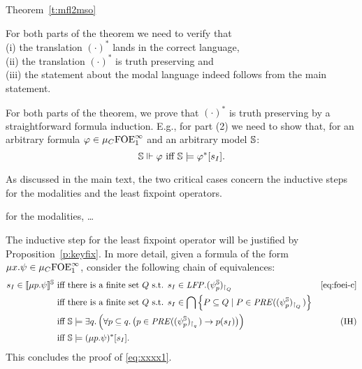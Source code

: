 \begin{proofof}{Theorem~\ref{t:mfl2mso}}
\btbs
\item
For both parts of the theorem we need to verify that 
\\ (i) the translation $(\cdot)^{*}$ lands in the correct language, 
\\ (ii) the translation $(\cdot)^{*}$ is truth preserving and
\\ (iii) the statement about the modal language indeed follows from the 
   main statement.
\etbs

For both parts of the theorem, we prove that $(\cdot)^{*}$ is truth preserving 
by a straightforward formula induction.
E.g., for part (2) we need to show that, for an arbitrary formula $\varphi\in
\mu_{C}\mathrm{FOE}^{\infty}_1$ and an arbitrary model $\mathbb{S}$:
\begin{equation}
\label{eq:xxxx1}
\model \mmodels \phi \text{ iff } \model \models \phi^{*}[s_{I}].
\end{equation}

As discussed in the main text, the two critical cases concern the inductive 
steps for the modalities and the least fixpoint operators.

\btbs
\item
for the modalities, \ldots
\etbs

The inductive step for the least fixpoint operator will be justified by 
Proposition~\ref{p:keyfix}.
In more detail, given a formula of the form $\mu x. \psi \in\mu_{C}\mathrm{FOE}^{\infty}_1$,
consider the following chain of equivalences:
\begin{align*}
s_{I} \in \mng{\mu p.\psi}^{\bbS} \text{ iff } &
   \text{there is a finite set $Q$ s.t. } 
   s_{I} \in \LFP. (\psi^{\model}_{p})_{\rst{Q}} 
   & \eqref{eq:foei-c}
\\ \text{ iff } &
\text{there is a finite set $Q$ s.t. } 
   s_{I} \in \bigcap \Big\{ P \subseteq Q \mid P \in 
   \PRE((\psi^{\model}_{p})_{\rst{Q}})\Big\} 
\\ \text{ iff } & 
    \bbS \models \exists q.\, \Big(\forall p \subseteq q.\,
       \big(p \in \PRE((\psi^{\model}_{p})_{\rst{q}}) \to p(s_{I})\big)
       \Big)
   & (\text{IH})
\\ \text{ iff } & 
    \bbS \models (\mu p. \psi)^{*}[s_{I}].
\end{align*}
This concludes the proof of \eqref{eq:xxxx1}.
\end{proofof}

